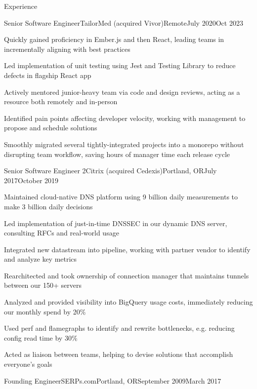 \documentclass[letterpaper,10pt]{article}
\begin{document}
\begin{rsection}{Experience}
\begin{rexperienceitem}{Senior Software Engineer}{TailorMed (acquired Vivor)}{Remote}{July 2020}{Oct 2023}
  \item Quickly gained proficiency in Ember.js and then React, leading teams in incrementally aligning with best practices
  \item Led implementation of unit testing using Jest and Testing Library to reduce defects in flagship React app
  \item Actively mentored junior-heavy team via code and design reviews, acting as a resource both remotely and in-person
  \item Identified pain points affecting developer velocity, working with management to propose and schedule solutions
  \item Smoothly migrated several tightly-integrated projects into a monorepo without disrupting team workflow, saving hours of manager time each release cycle
\end{rexperienceitem}
\begin{rexperienceitem}{Senior Software Engineer 2}{Citrix (acquired Cedexis)}{Portland, OR}{July 2017}{October 2019}
  \item Maintained cloud-native DNS platform using 9 billion daily measurements to make 3 billion daily decisions
  \item Led implementation of just-in-time DNSSEC in our dynamic DNS server, consulting RFCs and real-world usage
  \item Integrated new datastream into pipeline, working with partner vendor to identify and analyze key metrics
  \item Rearchitected and took ownership of connection manager that maintains tunnels between our 150+ servers
  \item Analyzed and provided visibility into BigQuery usage costs, immediately reducing our monthly spend by 20\%
  \item Used perf and flamegraphs to identify and rewrite bottlenecks, e.g. reducing config read time by 30\%
  \item Acted as liaison between teams, helping to devise solutions that accomplish everyone's goals
\end{rexperienceitem}
\begin{rexperienceitem}{Founding Engineer}{SERPs.com}{Portland, OR}{September 2009}{March 2017}

\end{rexperienceitem}
\end{rsection}
\end{document}
